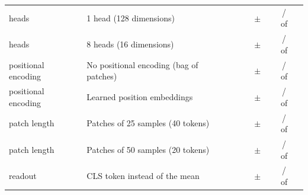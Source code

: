 \begin{tabular}{llrrcrcr}
\addlinespace
heads & 1 head (128 dimensions) & \transformerParamsHeadsOne{} & \transformerTokensHeadsOne{} & \transformerValAurocMeanHeadsOne{} $\pm$ \transformerValAurocSdHeadsOne{} & \transformerDiffMeanHeadsOne{} & \transformerNSeedsBetterHeadsOne{} / \transformerNSeedsWorseHeadsOne{} of \transformerNSeedsComparedHeadsOne{} & \transformerOrderDropHeadsOne{} \\
heads & 8 heads (16 dimensions) & \transformerParamsHeadsEight{} & \transformerTokensHeadsEight{} & \transformerValAurocMeanHeadsEight{} $\pm$ \transformerValAurocSdHeadsEight{} & \transformerDiffMeanHeadsEight{} & \transformerNSeedsBetterHeadsEight{} / \transformerNSeedsWorseHeadsEight{} of \transformerNSeedsComparedHeadsEight{} & \transformerOrderDropHeadsEight{} \\
\addlinespace
positional encoding & No positional encoding (bag of patches) & \transformerParamsNoPos{} & \transformerTokensNoPos{} & \transformerValAurocMeanNoPos{} $\pm$ \transformerValAurocSdNoPos{} & \transformerDiffMeanNoPos{} & \transformerNSeedsBetterNoPos{} / \transformerNSeedsWorseNoPos{} of \transformerNSeedsComparedNoPos{} & \transformerOrderDropNoPos{} \\
positional encoding & Learned position embeddings & \transformerParamsLearnedPos{} & \transformerTokensLearnedPos{} & \transformerValAurocMeanLearnedPos{} $\pm$ \transformerValAurocSdLearnedPos{} & \transformerDiffMeanLearnedPos{} & \transformerNSeedsBetterLearnedPos{} / \transformerNSeedsWorseLearnedPos{} of \transformerNSeedsComparedLearnedPos{} & \transformerOrderDropLearnedPos{} \\
\addlinespace
patch length & Patches of 25 samples (40 tokens) & \transformerParamsPatchTwoFive{} & \transformerTokensPatchTwoFive{} & \transformerValAurocMeanPatchTwoFive{} $\pm$ \transformerValAurocSdPatchTwoFive{} & \transformerDiffMeanPatchTwoFive{} & \transformerNSeedsBetterPatchTwoFive{} / \transformerNSeedsWorsePatchTwoFive{} of \transformerNSeedsComparedPatchTwoFive{} & \transformerOrderDropPatchTwoFive{} \\
patch length & Patches of 50 samples (20 tokens) & \transformerParamsPatchFiveZero{} & \transformerTokensPatchFiveZero{} & \transformerValAurocMeanPatchFiveZero{} $\pm$ \transformerValAurocSdPatchFiveZero{} & \transformerDiffMeanPatchFiveZero{} & \transformerNSeedsBetterPatchFiveZero{} / \transformerNSeedsWorsePatchFiveZero{} of \transformerNSeedsComparedPatchFiveZero{} & \transformerOrderDropPatchFiveZero{} \\
\addlinespace
readout & CLS token instead of the mean & \transformerParamsCls{} & \transformerTokensCls{} & \transformerValAurocMeanCls{} $\pm$ \transformerValAurocSdCls{} & \transformerDiffMeanCls{} & \transformerNSeedsBetterCls{} / \transformerNSeedsWorseCls{} of \transformerNSeedsComparedCls{} & \transformerOrderDropCls{} \\

\end{tabular}
